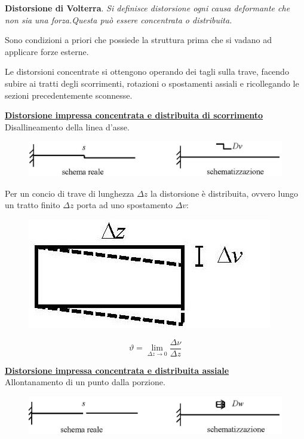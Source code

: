 \documentclass{article}
\begin{document}
\begin{adjustwidth}{2in}{}
		\textbf{Distorsione di Volterra}. \textit{Si definisce distorsione ogni causa deformante che non sia una forza.\newline Questa può essere concentrata o distribuita.} \newline
		
	Sono condizioni a priori che possiede la struttura prima che si vadano ad applicare forze esterne. \newline
		
		Le distorsioni concentrate si ottengono operando dei tagli sulla trave, facendo subire ai tratti degli
		scorrimenti, rotazioni o spostamenti assiali e ricollegando le sezioni precedentemente sconnesse. 
\newpage
		
\underline{\textbf{Distorsione impressa concentrata e distribuita di scorrimento}} \mbox{} \\

Disallineamento della linea d'asse.

\begin{figure}[H]
	\centering
	\includegraphics[width=0.7\linewidth]{"immagini/1.PARTE8_Pagina_02"}
\end{figure}
	
		Per un concio di trave di lunghezza $ \Delta z$ la distorsione è distribuita, ovvero lungo un tratto finito $\Delta z$ porta ad uno spostamento $\Delta v$:
		
\begin{figure}[H]
	\centering
	\includegraphics[width=0.2\linewidth]{"immagini/1.PARTE8_Pagina_04 (2)"}
\end{figure}
\[ \vartheta = \lim_{\Delta z \rightarrow 0} \dfrac{\Delta\nu}{\Delta z}\]
		
\underline{\textbf{	Distorsione impressa concentrata e distribuita assiale}} \mbox{} \\

Allontanamento di un punto dalla porzione.

\begin{figure}[H]
	\centering
	\includegraphics[width=0.7\linewidth]{"immagini/1.PARTE8_Pagina_03 (2)"}
\end{figure}


\end{adjustwidth}
\end{document}
